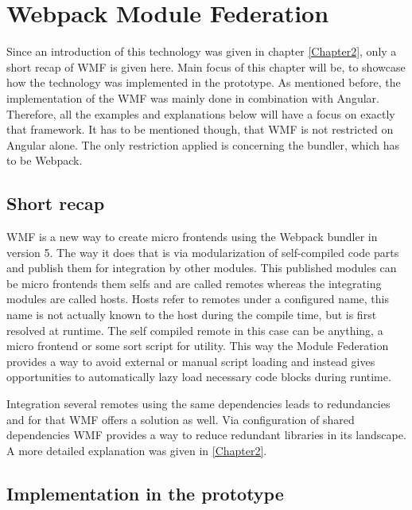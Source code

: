 \chapter{Webpack Module Federation} %
\label{Chapter5}


Since an introduction of this technology was given in chapter \ref{Chapter2}, only a short recap of WMF is given here. Main focus of this chapter will be, to showcase how the technology was implemented in the prototype. As mentioned before, the implementation of the WMF was mainly done in combination with Angular. Therefore, all the examples and explanations below will have a focus on exactly that framework. It has to be mentioned though, that WMF is not restricted on Angular alone. The only restriction applied is concerning the bundler, which has to be Webpack.\cite{wmf_concepts}

\section{Short recap}

WMF is a new way to create micro frontends using the Webpack bundler in version 5. The way it does that is via modularization of self-compiled code parts and publish them for integration by other modules. This published modules can be micro frontends them selfs and are called remotes whereas the integrating modules are called hosts. 
Hosts refer to remotes under a configured name, this name is not actually known to the host during the compile time, but is first resolved at runtime.
The self compiled remote in this case can be anything, a micro frontend or some sort script for utility. This way the Module Federation provides a way to avoid external or manual script loading and instead gives opportunities to automatically lazy load necessary code blocks during runtime.\cite{wmf_concepts}

Integration several remotes using the same dependencies leads to redundancies and for that WMF offers a solution as well. Via configuration of shared dependencies WMF provides a way to reduce redundant libraries in its landscape. A more detailed explanation was given in \ref{Chapter2}.

\section{Implementation in the prototype}

